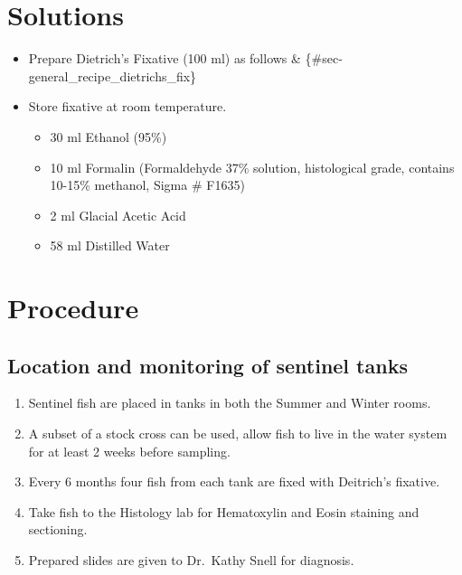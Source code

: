\documentclass[
  letterpaper,
  DIV=11,
  numbers=noendperiod]{scrreprt}
\providecommand{\tightlist}{%
  \setlength{\itemsep}{0pt}\setlength{\parskip}{0pt}}\usepackage{longtable,booktabs,array}
\begin{document}
\hypertarget{solutions-42}{%
\section{Solutions}\label{solutions-42}}

\begin{itemize}
\tightlist
\item
  Prepare Dietrich's Fixative (100 ml) as follows \&
  \{\#sec-general\_recipe\_dietrichs\_fix\}
\item
  Store fixative at room temperature.

  \begin{itemize}
  \tightlist
  \item
    30 ml Ethanol (95\%)
  \item
    10 ml Formalin (Formaldehyde 37\% solution, histological grade,
    contains 10-15\% methanol, Sigma \# F1635)
  \item
    2 ml Glacial Acetic Acid
  \item
    58 ml Distilled Water
  \end{itemize}
\end{itemize}

\hypertarget{procedure-51}{%
\section{Procedure}\label{procedure-51}}

\hypertarget{location-and-monitoring-of-sentinel-tanks}{%
\subsection{Location and monitoring of sentinel
tanks}\label{location-and-monitoring-of-sentinel-tanks}}

\begin{enumerate}
\def\labelenumi{\arabic{enumi}.}
\tightlist
\item
  Sentinel fish are placed in tanks in both the Summer and Winter rooms.
\item
  A subset of a stock cross can be used, allow fish to live in the water
  system for at least 2 weeks before sampling.
\item
  Every 6 months four fish from each tank are fixed with Deitrich's
  fixative.
\item
  Take fish to the Histology lab for Hematoxylin and Eosin staining and
  sectioning.
\item
  Prepared slides are given to Dr.~Kathy Snell for diagnosis.
\end{enumerate}
\end{document}
